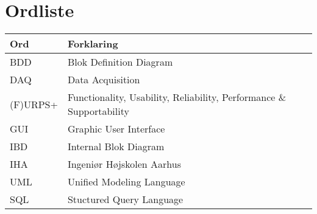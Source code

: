 \chapter{Ordliste}


\begin{longtabu} to 
    Ord &    Forklaring\\
    \toprule
    BDD & Blok Definition Diagram \\	    
    DAQ & Data Acquisition\\
    (F)URPS+ & Functionality, Usability, Reliability, Performance \& Supportability\\
	GUI & Graphic User Interface\\
	IBD & Internal Blok Diagram\\
	IHA & Ingeniør Højskolen Aarhus\\
	UML & Unified Modeling Language\\
	SQL & Stuctured Query Language\\
\end{longtabu}